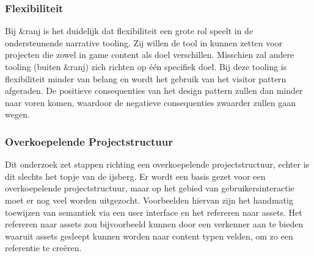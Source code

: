 \subsubsection{Flexibiliteit}
Bij \&ranj is het duidelijk dat flexibiliteit een grote rol speelt in de ondersteunende narrative tooling. Zij willen de tool in kunnen zetten voor projecten die zowel in game content als doel verschillen. Misschien zal andere tooling (buiten \&ranj) zich richten op één specifiek doel. Bij deze tooling is flexibiliteit minder van belang en wordt het gebruik van het visitor pattern afgeraden. De positieve consequenties van het design pattern zullen dan minder naar voren komen, waardoor de negatieve consequenties zwaarder zullen gaan wegen.

\subsubsection{Overkoepelende Projectstructuur}
Dit onderzoek zet stappen richting een overkoepelende projectstructuur, echter is dit slechts het topje van de ijsberg. Er wordt een basis gezet voor een overkoepelende projectstructuur, maar op het gebied van gebruikersinteractie moet er nog veel worden uitgezocht. Voorbeelden hiervan zijn het handmatig toewijzen van semantiek via een user interface en het refereren naar assets. Het refereren naar assets zou bijvoorbeeld kunnen door een verkenner aan te bieden waaruit assets gesleept kunnen worden naar content typen velden, om zo een referentie te creëren.